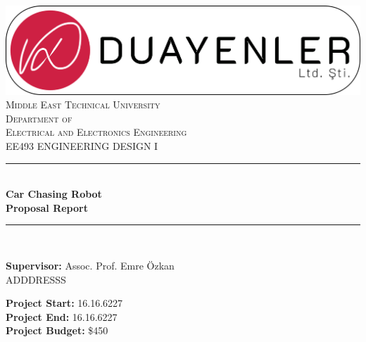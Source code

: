 \documentclass[a4paper,12pt]{article}
\begin{document}
\begin{titlepage}

\newcommand{\HRule}{\rule{\linewidth}{0.5mm}} %
\centering 

\includegraphics[width=\textwidth,height=\textheight,keepaspectratio]{../../Documents/logos/logo3-with-stroke}\\[0.5cm]

\textsc{\LARGE Middle East Technical University}\\[0.5cm] %
\textsc{\Large Department of \\Electrical and Electronics Engineering }\\[0.5cm] %
\textsc{\large EE493 ENGINEERING DESIGN I}\\[0.5cm] %


\HRule \\[0cm]
{ \huge \bfseries  Car Chasing Robot\\[0.1cm] \LARGE \bfseries Proposal Report}\\[0cm] %
\HRule \\[1cm]

\begin{minipage}[l]{0.6\textwidth}
\raggedright
		
		\large{\textbf{Supervisor:}}	Assoc. Prof. Emre Özkan \\
		\hspace{3.05cm}ADDDRESSS

\end{minipage}
\begin{minipage}[r]{0.35\textwidth}
\raggedright
		\textbf{Project Start:} 16.16.6227\\
		\textbf{Project End:} 16.16.6227\\
		\textbf{Project Budget:} \$450


\end{minipage}
\end{titlepage}
\end{document}
